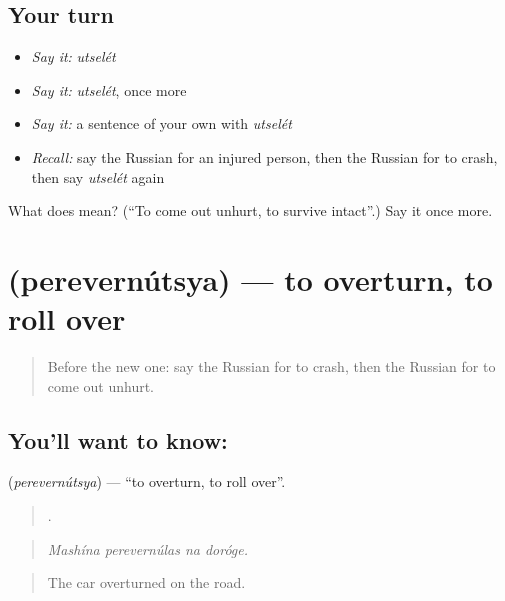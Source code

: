 \subsection*{Your turn}
\begin{itemize}
\raggedright
  \item \emph{Say it:} \emph{utselét}
  \item \emph{Say it:} \emph{utselét}, once more
  \item \emph{Say it:} a sentence of your own with \emph{utselét}
  \item \emph{Recall:} say the Russian for an injured person, then the Russian for to crash, then say \emph{utselét} again
\end{itemize}

\begin{tcolorbox}[breakable,colback=teal!4,colframe=teal!35!black,title={Before you move on}]
What does  mean? (\textquotedblleft{}To come out unhurt, to survive intact\textquotedblright{}.) Say it once more.
\end{tcolorbox}
\section[\texorpdfstring{\ru{перевернуться} (perevernútsya)}{перевернуться (perevernútsya)}]{ (perevernútsya) — to overturn, to roll over}

\label{lesson:RU-C298-perevernutsya}



\begin{quote}
Before the new one: say the Russian for to crash, then the Russian for to come out unhurt.
\end{quote}

\subsection*{You'll want to know: }
\textbf{} (\emph{perevernútsya}) — \textquotedblleft{}to overturn, to roll over\textquotedblright{}.

\begin{quote}
   .
\end{quote}

\begin{quote}
\emph{Mashína perevernúlas na doróge.}
\end{quote}

\begin{quote}
The car overturned on the road.
\end{quote}

